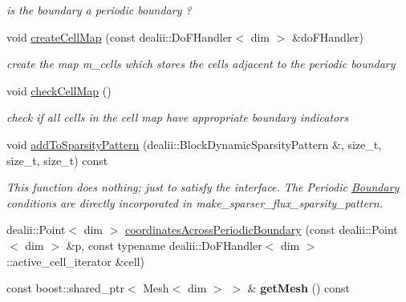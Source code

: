 \begin{DoxyCompactItemize}
\begin{DoxyCompactList}\small\item\em is the boundary a periodic boundary ? \item\end{DoxyCompactList}\item 
void \hyperlink{classnatrium_1_1PeriodicBoundary_a233d460baa307b13bc32efb57c07f7c5}{createCellMap} (const dealii::DoFHandler$<$ dim $>$ \&doFHandler)
\begin{DoxyCompactList}\small\item\em create the map m\_\-cells which stores the cells adjacent to the periodic boundary \item\end{DoxyCompactList}\item 
\hypertarget{classnatrium_1_1PeriodicBoundary_a4885d5d5d4c8965db5534390ad877511}{
void \hyperlink{classnatrium_1_1PeriodicBoundary_a4885d5d5d4c8965db5534390ad877511}{checkCellMap} ()}
\label{classnatrium_1_1PeriodicBoundary_a4885d5d5d4c8965db5534390ad877511}

\begin{DoxyCompactList}\small\item\em check if all cells in the cell map have appropriate boundary indicators \item\end{DoxyCompactList}\item 
\hypertarget{classnatrium_1_1PeriodicBoundary_af46e4e91a6b612fb3b2ef658b962d5d8}{
void \hyperlink{classnatrium_1_1PeriodicBoundary_af46e4e91a6b612fb3b2ef658b962d5d8}{addToSparsityPattern} (dealii::BlockDynamicSparsityPattern \&, size\_\-t, size\_\-t, size\_\-t) const }
\label{classnatrium_1_1PeriodicBoundary_af46e4e91a6b612fb3b2ef658b962d5d8}

\begin{DoxyCompactList}\small\item\em This function does nothing; just to satisfy the interface. The Periodic \hyperlink{classnatrium_1_1Boundary}{Boundary} conditions are directly incorporated in make\_\-sparser\_\-flux\_\-sparsity\_\-pattern. \item\end{DoxyCompactList}\item 
dealii::Point$<$ dim $>$ \hyperlink{classnatrium_1_1PeriodicBoundary_a9a5677bbc1d59499ceec15a7893b8688}{coordinatesAcrossPeriodicBoundary} (const dealii::Point$<$ dim $>$ \&p, const typename dealii::DoFHandler$<$ dim $>$::active\_\-cell\_\-iterator \&cell)
\item 
\hypertarget{classnatrium_1_1PeriodicBoundary_a1351b925b9ae2008539a351a4baac3e0}{
const boost::shared\_\-ptr$<$ Mesh$<$ dim $>$ $>$ \& {\bfseries getMesh} () const }
\label{classnatrium_1_1PeriodicBoundary_a1351b925b9ae2008539a351a4baac3e0}


\end{DoxyCompactItemize}
